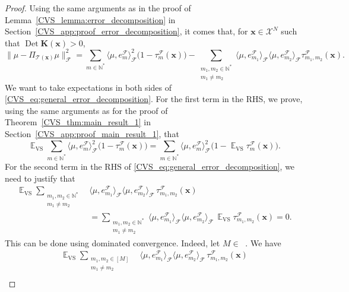 \documentclass[twoside,11pt]{book}
\numberwithin{theorem}{chapter}
\numberwithin{definition}{chapter}
\numberwithin{proposition}{chapter}
\numberwithin{corollary}{chapter}
\numberwithin{example}{chapter}
\numberwithin{lemma}{chapter}
\numberwithin{assumption}{chapter}
\DeclareMathOperator{\Det}{Det}
\DeclareMathOperator{\VS}{\mathrm{VS}}
\DeclareMathOperator{\EX}{\mathbb{E}}
\DeclareMathOperator{\F}{\mathcal{F}}
\DeclareMathOperator{\Ns}{\mathbb{N}^{*}}
\begin{document}
\begin{proof}
Using the same arguments as in the proof of Lemma~\ref{CVS_lemma:error_decomposition} in Section~\ref{CVS_app:proof_error_decomposition}, it comes that,
for $\bm{x} \in \mathcal{X}^{N}$ such that $\Det \bm{K}(\bm{x}) > 0$,
\begin{equation}\label{CVS_eq:general_error_decomposition}
\|\mu - \Pi_{\mathcal{T}(\bm{x})} \mu\|_{\F}^{2}  = \sum\limits_{m \in \mathbb{N}^{*}} \langle \mu, e_{m}^{\F} \rangle_{\F}^{2}\bigg(1- \tau_{m}^{\F}(\bm{x})\bigg) - \sum\limits_{\substack{m_{1},m_{2} \in \mathbb{N}^{*} \\ m_{1} \neq m_{2}}}  \langle \mu, e_{m_{1}}^{\F} \rangle_{\F} \langle \mu, e_{m_{2}}^{\F} \rangle_{\F} \tau_{m_{1},m_{2}}^{\F}(\bm{x}).
\end{equation}
We want to take expectations in both sides of \eqref{CVS_eq:general_error_decomposition}. For the first term in the RHS, we prove, using the same arguments as for the proof of Theorem~\ref{CVS_thm:main_result_1} in Section~\ref{CVS_app:proof_main_result_1}, that
\begin{equation}\label{CVS_eq:EX_VS_lvs_interpolation}
\EX_{\VS} \sum\limits_{m \in \mathbb{N}^{*}} \langle \mu, e_{m}^{\F} \rangle_{\F}^{2}\bigg(1- \tau_{m}^{\F}(\bm{x})\bigg) = \sum\limits_{m \in \mathbb{N}^{*}} \langle \mu, e_{m}^{\F} \rangle_{\F}^{2}\bigg(1- \EX_{\VS}\tau_{m}^{\F}(\bm{x})\bigg).
\end{equation}
For the second term in the RHS of \eqref{CVS_eq:general_error_decomposition}, we need to justify that
\begin{align}
\EX_{\VS} \sum\limits_{\substack{m_{1},m_{2} \in \mathbb{N}^{*} \\ m_{1} \neq m_{2}}}  &\langle \mu, e_{m_{1}}^{\F} \rangle_{\F} \langle \mu, e_{m_{2}}^{\F} \rangle_{\F} \, \tau_{m_{1},m_{2}}^{\F}(\bm{x}) \nonumber\\
& = \sum\limits_{\substack{m_{1},m_{2} \in \mathbb{N}^{*} \\ m_{1} \neq m_{2}}}  \langle \mu, e_{m_{1}}^{\F} \rangle_{\F} \langle \mu, e_{m_{2}}^{\F} \rangle_{\F} \,\EX_{\VS}\tau_{m_{1},m_{2}}^{\F}(\bm{x}) = 0.
\label{CVS_eq:EX_VS_cross_lvs_interpolation}
\end{align}
This can be done using dominated convergence. Indeed, let $M \in \Ns$. We have
\begin{align}
\EX_{\VS} \sum\limits_{\substack{m_{1},m_{2} \in [M] \\ m_{1} \neq m_{2}}}  &\langle \mu, e_{m_{1}}^{\F} \rangle_{\F} \langle \mu, e_{m_{2}}^{\F} \rangle_{\F} \,\tau_{m_{1},m_{2}}^{\F}(\bm{x}) \nonumber\\

\end{align}
\end{proof}
\end{document}
